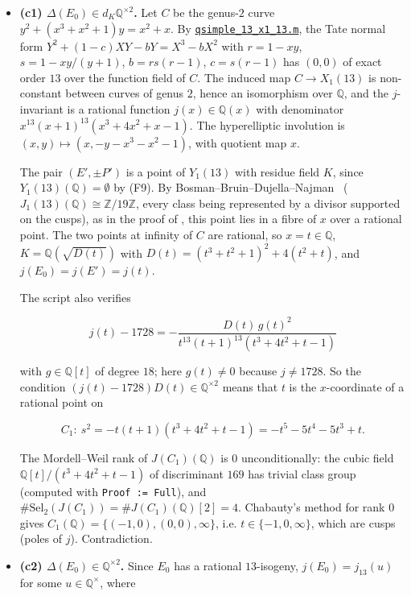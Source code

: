 \documentclass[11pt]{article}
\newcommand{\Q}{\mathbb Q}
\newcommand{\Z}{\mathbb Z}
\begin{document}
\begin{itemize}
\item \textbf{(c1) \(\Delta(E_0)\in d_K\Q^{\times2}\).} Let \(C\) be the genus-\(2\) curve
          \(y^2+(x^3+x^2+1)y=x^2+x\). By \href{https://genus-2-torsion.github.io/data/knowledge/sources/qsimple_13_x1_13.m}{\texttt{qsimple\_\allowbreak{}13\_\allowbreak{}x1\_\allowbreak{}13.m}}, the Tate normal form
          \(Y^2+(1-c)XY-bY=X^3-bX^2\) with \(r=1-xy\), \(s=1-xy/(y+1)\), \(b=rs(r-1)\), \(c=s(r-1)\) has \((0,0)\)
          of exact order \(13\) over the function field of \(C\). The induced map \(C\to X_1(13)\) is
          non-constant between curves of genus \(2\), hence an isomorphism over \(\Q\), and the \(j\)-invariant
          is a rational function \(j(x)\in\Q(x)\) with denominator \(x^{13}(x+1)^{13}(x^3+4x^2+x-1)\). The
          hyperelliptic involution is \((x,y)\mapsto(x,-y-x^3-x^2-1)\), with quotient map \(x\).

The pair \((E',\pm P')\) is a point of \(Y_1(13)\) with residue field \(K\), since
          \(Y_1(13)(\Q)=\emptyset\) by (F9). By Bosman--Bruin--Dujella--Najman~\cite[Lemmas 12 and 13]{BBDN} (\(J_1(13)(\Q)\cong\Z/19\Z\), every
          class being represented by a divisor supported on the cusps), as in the proof of
          \cite[Theorem 9(1)]{BBDN}, this point lies in a fibre of \(x\) over a rational point. The
          two points at infinity of \(C\) are rational, so \(x=t\in\Q\), \(K=\Q(\sqrt{D(t)})\) with
          \(D(t)=(t^3+t^2+1)^2+4(t^2+t)\), and \(j(E_0)=j(E')=j(t)\).

The script also verifies

\[
j(t)-1728=-\frac{D(t)\,g(t)^2}{t^{13}(t+1)^{13}(t^3+4t^2+t-1)}
\]

with \(g\in\Q[t]\) of degree \(18\); here \(g(t)\neq0\) because \(j\neq1728\). So the condition
          \((j(t)-1728)D(t)\in\Q^{\times2}\) means that \(t\) is the \(x\)-coordinate of a rational point on

\[
C_1:\ s^2=-t(t+1)(t^3+4t^2+t-1)=-t^5-5t^4-5t^3+t.
\]

The Mordell--Weil rank of \(J(C_1)(\Q)\) is \(0\) unconditionally: the cubic field
          \(\Q[t]/(t^3+4t^2+t-1)\) of discriminant \(169\) has trivial class group (computed with
          \texttt{Proof := {}Full{}}), and \(\#\mathrm{Sel}_2(J(C_1))=\#J(C_1)(\Q)[2]=4\). Chabauty's method for rank
          \(0\) gives \(C_1(\Q)=\{(-1,0),(0,0),\infty\}\), i.e. \(t\in\{-1,0,\infty\}\), which are cusps (poles of
          \(j\)). Contradiction.
\item \textbf{(c2) \(\Delta(E_0)\in\Q^{\times2}\).} Since \(E_0\) has a rational \(13\)-isogeny,
          \(j(E_0)=j_{13}(u)\) for some \(u\in\Q^\times\), where


\end{itemize}
\end{document}
